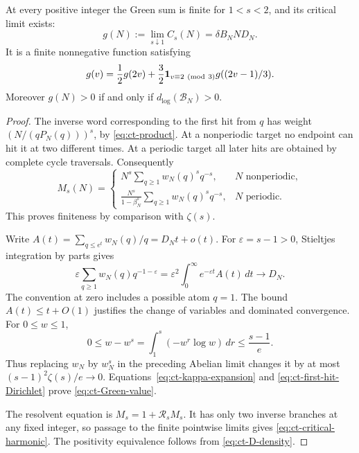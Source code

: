 \begin{theorem}\label{thm:ct-Green}
At every positive integer the Green sum is finite for \(1<s<2\),
and its critical limit exists:
\begin{equation}\label{eq:ct-Green-value}
 g(N):=\lim_{s\downarrow1}C_s(N)=\delta B_N N D_N.
\end{equation}
It is a finite nonnegative function satisfying
\begin{equation}\label{eq:ct-critical-harmonic}
 g(v)=\frac12g(2v)
       +\frac32\mathbf1_{v\equiv2\ ({\rm mod}\ 3)}g((2v-1)/3).
\end{equation}
Moreover \(g(N)>0\) if and only if \(d_{\log}(\mathcal B_N)>0\).
\end{theorem}
\begin{proof}
The inverse word corresponding to the first hit from \(q\) has
weight \((N/(qP_N(q)))^s\), by \eqref{eq:ct-product}.
At a nonperiodic target no endpoint can hit it at two different
times. At a periodic target all later hits are obtained by complete
cycle traversals. Consequently
\begin{equation}\label{eq:ct-first-hit-Dirichlet}
 M_s(N)=
 \begin{cases}
 N^s\displaystyle\sum_{q\ge1}w_N(q)^s q^{-s},
                       &N\text{ nonperiodic},\\[4pt]
 \displaystyle\frac{N^s}{1-\beta_N^s}
          \sum_{q\ge1}w_N(q)^s q^{-s},
                       &N\text{ periodic}.
 \end{cases}
\end{equation}
This proves finiteness by comparison with \(\zeta(s)\).

Write \(A(t)=\sum_{q\le e^t}w_N(q)/q=D_Nt+o(t)\).
For \(\varepsilon=s-1>0\), Stieltjes integration by parts gives
\[
 \varepsilon\sum_{q\ge1}w_N(q)q^{-1-\varepsilon}
       =\varepsilon^2\int_0^\infty e^{-\varepsilon t}A(t)\,dt
       \longrightarrow D_N.
\]
The convention at zero includes a possible atom \(q=1\).
The bound \(A(t)\le t+O(1)\) justifies the change of variables
and dominated convergence. For \(0\le w\le1\),
\[
 0\le w-w^s
 =\int_1^s(-w^r\log w)\,dr\le\frac{s-1}{e}.
\]
Thus replacing \(w_N\) by \(w_N^s\) in the preceding Abelian limit
changes it by at most
\((s-1)^2\zeta(s)/e\to0\).
Equations~\eqref{eq:ct-kappa-expansion} and
\eqref{eq:ct-first-hit-Dirichlet} prove \eqref{eq:ct-Green-value}.

The resolvent equation is \(M_s=1+\mathcal R_sM_s\).
It has only two inverse branches at any fixed integer, so passage
to the finite pointwise limits gives
\eqref{eq:ct-critical-harmonic}. The positivity equivalence follows
from \eqref{eq:ct-D-density}.
\end{proof}

